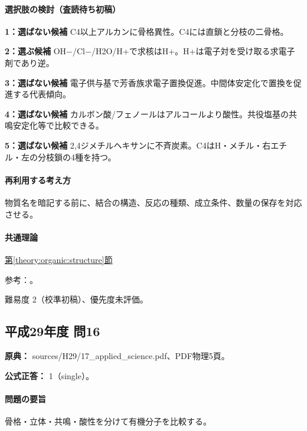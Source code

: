 \paragraph{選択肢の検討（査読待ち初稿）}\mbox{}\par

\noindent\textbf{1：選ばない候補} C4以上アルカンに骨格異性。C4には直鎖と分枝の二骨格。\par

\noindent\textbf{2：選ぶ候補} OH−/Cl−/H2O/H+で求核はH+。H+は電子対を受け取る求電子剤であり逆。\par

\noindent\textbf{3：選ばない候補} 電子供与基で芳香族求電子置換促進。中間体安定化で置換を促進する代表傾向。\par

\noindent\textbf{4：選ばない候補} カルボン酸/フェノールはアルコールより酸性。共役塩基の共鳴安定化等で比較できる。\par

\noindent\textbf{5：選ばない候補} 2,4ジメチルヘキサンに不斉炭素。C4はH・メチル・右エチル・左の分枝鎖の4種を持つ。\par

\paragraph{再利用する考え方} 物質名を暗記する前に、結合の構造、反応の種類、成立条件、数量の保存を対応させる。

\paragraph{共通理論} \hyperref[theory:organic:structure]{第\ref*{theory:organic:structure}節}

\par 参考：\cite{organic_chirality,organic_directing}。

\par 難易度 2（校準初稿）、優先度未評価。

\subsection{平成29年度 問16}
\label{q:h29-reg-applied-16}

\noindent\textbf{原典：} sources/H29/17\_applied\_science.pdf、PDF物理5頁。

\textbf{公式正答：} 1（single）。

\paragraph{問題の要旨} 骨格・立体・共鳴・酸性を分けて有機分子を比較する。

